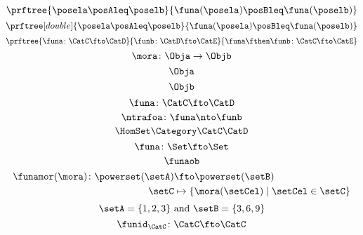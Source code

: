 {\begin{forslides}
        \begin{equation}
            \label{eq:mono2}
            \prftree{\posela \posAleq \poselb}{\funa(\posela) \posBleq \funa(\poselb)}
        \end{equation}
        \begin{equation}
            \label{eq:mono3}
            \prftree[double]{\posela \posAleq \poselb}{\funa(\posela) \posBleq \funa(\poselb)}
        \end{equation}
        \begin{equation}
            \label{eq:functor-composition1}
            \prftree{\funa\colon \CatC \fto \CatD}{\funb\colon\CatD\fto\CatE}{\funa\fthen\funb\colon \CatC \fto \CatE}
        \end{equation}
        \begin{equation}
            \label{eq:slides_mora}
            \mora\colon \Obja\to\Objb
        \end{equation}
        \begin{equation}
            \label{eq:slides_mora_obja}
            \Obja
        \end{equation}
        \begin{equation}
            \label{eq:slides_mora_objb}
            \Objb
        \end{equation}
        \begin{equation}
            \label{eq:slides_funa}
            \funa\colon\CatC\fto\CatD
        \end{equation}
        \begin{equation}
            \label{eq:slides_ntrafoa}
            \ntrafoa\colon\funa\nto\funb
        \end{equation}
        \begin{equation}
            \label{eq:slides_hom}
            \HomSet\Category\CatC\CatD
        \end{equation}
        \begin{equation}
            \label{eq:pow_fun_1}
            \funa\colon \Set \fto \Set
        \end{equation}
        \begin{equation}
            \label{eq:pow_fun_2}
            \funaob
        \end{equation}
        \begin{equation}
            \label{eq:pow_fun_3}
            \begin{aligned}
                \funamor(\mora)\colon \powerset(\setA)&\fto \powerset(\setB)\\
                \setC&\mapsto \{ \mora(\setCel) \mid \setCel \in \setC\}
            \end{aligned}
        \end{equation}
        \begin{equation}
            \label{eq:pow_fun_4}
            \setA=\{ 1,2,3\} \text{ and }\setB=\{3,6,9\}
        \end{equation}
        \begin{equation}
            \label{eq:idfun}
            \funid_\CatC \colon \CatC \fto \CatC
        \end{equation}
    \end{forslides}
}

